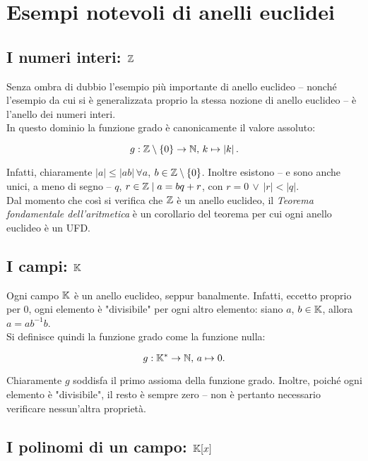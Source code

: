 \documentclass[11pt]{scrbook}
\begin{document}
\chapter{Esempi notevoli di anelli euclidei}

\section{I numeri interi: \texorpdfstring{$\mathbb Z$}{Z}}

Senza ombra di dubbio l'esempio più importante di anello euclideo -- nonché
l'esempio da cui si è generalizzata proprio la stessa nozione di anello
euclideo -- è l'anello dei numeri interi. \\

In questo dominio la funzione grado è canonicamente il valore assoluto:

\[g : \mathbb Z \setminus \{0\} \to \mathbb N, \, k \mapsto \left|k\right|.\]

\vskip 0.1in

Infatti, chiaramente $|a| \leq |ab|\, \forall a$, $b \in \mathbb Z \setminus \{0\}$. Inoltre
esistono -- e sono anche unici, a meno di segno -- $q$, $r \in \mathbb Z \mid a = bq + r$, con $r=0 \,\lor\,
    \left|r\right| < \left|q\right|$. \\

Dal momento che così si verifica che $\mathbb Z$ è un anello euclideo, il \textit{Teorema
    fondamentale dell'aritmetica} è un corollario del teorema per cui ogni anello
    euclideo è un UFD.

\section{I campi: \texorpdfstring{$\mathbb{K}$}{K}}

Ogni campo $\mathbb{K}$ è un anello euclideo, seppur banalmente. Infatti, eccetto proprio
per $0$, ogni elemento è "divisibile" per ogni altro elemento: siano $a$, $b \in \mathbb{K}$,
allora $a = ab^{-1}b$. \\

Si definisce quindi la funzione grado come la funzione nulla:

\[g : \mathbb{K}^* \to \mathbb N, \, a \mapsto 0.\]

\vskip 0.1in

Chiaramente $g$ soddisfa il primo assioma della funzione grado. Inoltre,
poiché ogni elemento è "divisibile", il resto è sempre zero -- non è pertanto
necessario verificare nessun'altra proprietà.

\section{I polinomi di un campo: \texorpdfstring{$\mathbb{K}[x]$}{K[x]}}
\end{document}
